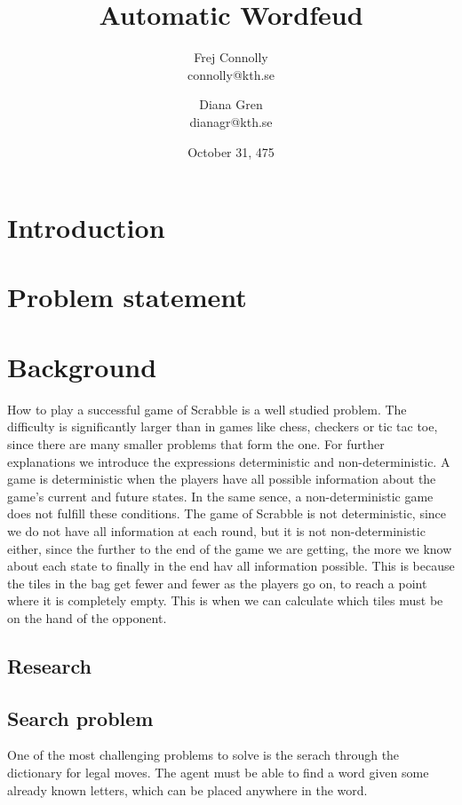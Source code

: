 \documentclass[a4paper, 12pt]{report}
\begin{document}
\title{Automatic Wordfeud}
\date{October 31, 475}
\author{Frej Connolly \\ connolly@kth.se
        \and Diana Gren \\ dianagr@kth.se}

\maketitle
\tableofcontents


\chapter{Introduction}	

\chapter{Problem statement}
\chapter{Background}
How to play a successful game of Scrabble is a well studied problem. The difficulty is significantly larger than in games like chess, checkers or tic tac toe, since there are many smaller problems that form the one. For further explanations we introduce the expressions deterministic and non-deterministic. A game is deterministic when the players have all possible information about the game's current and future states. In the same sence, a non-deterministic game does not fulfill these conditions. The game of Scrabble is not deterministic, since we do not have all information at each round, but it is not non-deterministic either, since the further to the end of the game we are getting, the more we know about each state to finally in the end hav all information possible. This is because the tiles in the bag get fewer and fewer as the players go on, to reach a point where it is completely empty. This is when we can calculate which tiles must be on the hand of the opponent.
\section{Research}


\section{Search problem}
One of the most challenging problems to solve is the serach through the dictionary for legal moves. The agent must be able to find a word given some already known letters, which can be placed anywhere in the word.
\end{document}
